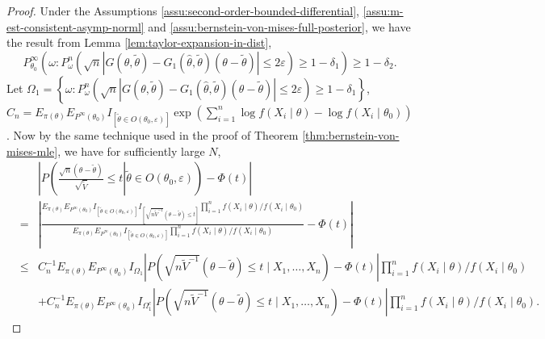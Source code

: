 \documentclass[oneside,english]{amsbook}
\numberwithin{section}{chapter}
\numberwithin{equation}{section}
\numberwithin{figure}{section}
\theoremstyle{plain}
\theoremstyle{plain}
\theoremstyle{definition}
\theoremstyle{plain}
\theoremstyle{plain}
\theoremstyle{remark}
\theoremstyle{definition}
\theoremstyle{definition}
\begin{document}
\begin{proof}
Under the Assumptions \ref{assu:second-order-bounded-differential},
\ref{assu:m-est-consistent-asymp-norml} and \ref{assu:bernstein-von-mises-full-posterior},
we have the result from Lemma \ref{lem:taylor-expansion-in-dist},
\begin{equation}
P_{\theta_{0}}^{\infty}\left(\omega:P_{\omega}^{n}\left(\sqrt{n}\left|G\left(\theta,\tilde{\theta}\right)-G_{1}\left(\hat{\theta},\tilde{\theta}\right)\left(\theta-\tilde{\theta}\right)\right|\le2\varepsilon\right)\ge1-\delta_{1}\right)\ge1-\delta_{2}.\label{eq:conv-in-dist-reminder}
\end{equation}
Let $\Omega_{1}=\left\{ \omega:P_{\omega}^{n}\left(\sqrt{n}\left|G\left(\theta,\tilde{\theta}\right)-G_{1}\left(\hat{\theta},\tilde{\theta}\right)\left(\theta-\tilde{\theta}\right)\right|\le2\varepsilon\right)\ge1-\delta_{1}\right\} $,
$C_{n}=E_{\pi\left(\theta\right)}E_{P^{\infty}\left(\theta_{0}\right)}I_{\left[\tilde{\theta}\in O\left(\theta_{0},\varepsilon\right)\right]}\exp\left(\sum_{i=1}^{n}\log f\left(X_{i}\mid\theta\right)-\log f\left(X_{i}\mid\theta_{0}\right)\right)$.
Now by the same technique used in the proof of Theorem \ref{thm:bernstein-von-mises-mle},
we have for sufficiently large $N$, 
\begin{eqnarray*}
 &  & \left|P\left(\left.\frac{\sqrt{n}\left(\theta-\tilde{\theta}\right)}{\sqrt{\tilde{V}}}\le t\right|\tilde{\theta}\in O\left(\theta_{0},\varepsilon\right)\right)-\Phi\left(t\right)\right|\\
 & = & \left|\frac{E_{\pi\left(\theta\right)}E_{P^{\infty}\left(\theta_{0}\right)}I_{\left[\tilde{\theta}\in O\left(\theta_{0},\varepsilon\right)\right]}I_{\left[\sqrt{n\tilde{V}^{-1}}\left(\theta-\tilde{\theta}\right)\le t\right]}\prod_{i=1}^{n}f\left(X_{i}\mid\theta\right)/f\left(X_{i}\mid\theta_{0}\right)}{E_{\pi\left(\theta\right)}E_{P^{\infty}\left(\theta_{0}\right)}I_{\left[\tilde{\theta}\in O\left(\theta_{0},\varepsilon\right)\right]}\prod_{i=1}^{n}f\left(X_{i}\mid\theta\right)/f\left(X_{i}\mid\theta_{0}\right)}-\Phi\left(t\right)\right|\\
 & \le & C_{n}^{-1}E_{\pi\left(\theta\right)}E_{P^{\infty}\left(\theta_{0}\right)}I_{\Omega_{1}}\left|P\left(\sqrt{n\tilde{V}^{-1}}\left(\theta-\tilde{\theta}\right)\le t\mid X_{1},\ldots,X_{n}\right)-\Phi\left(t\right)\right|\prod_{i=1}^{n}f\left(X_{i}\mid\theta\right)/f\left(X_{i}\mid\theta_{0}\right)\\
 &  & +C_{n}^{-1}E_{\pi\left(\theta\right)}E_{P^{\infty}\left(\theta_{0}\right)}I_{\Omega_{1}^{c}}\left|P\left(\sqrt{n\tilde{V}^{-1}}\left(\theta-\tilde{\theta}\right)\le t\mid X_{1},\ldots,X_{n}\right)-\Phi\left(t\right)\right|\prod_{i=1}^{n}f\left(X_{i}\mid\theta\right)/f\left(X_{i}\mid\theta_{0}\right).
\end{eqnarray*}



\end{proof}
\end{document}
